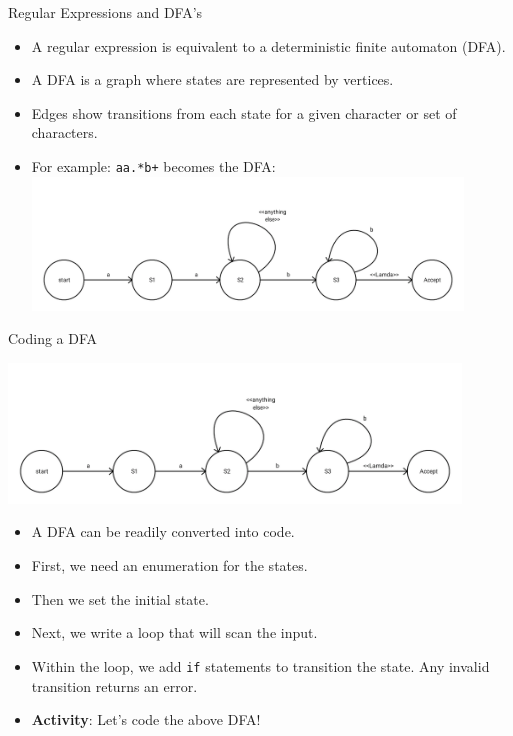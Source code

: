 \documentclass[]{beamer}
\begin{document}
\begin{frame}{Regular Expressions and DFA's}
    \begin{itemize}[<+->]
        \item A regular expression is equivalent to a deterministic
            finite automaton (DFA).
        \item A DFA is a graph where states are represented by vertices.
        \item Edges show transitions from each state for a given
            character or set of characters.
        \item For example: \texttt{aa.*b+} becomes the DFA:
            \newline\includegraphics[width=0.9\textwidth]{images/aabdfa} 
    \end{itemize}
\end{frame}

\begin{frame}{Coding a DFA}
    \begin{center}
        \includegraphics[width=0.9\textwidth]{images/aabdfa} 
    \end{center}
    \begin{itemize}[<+->]
        \item A DFA can be readily converted into code.
        \item First, we need an enumeration for the states.
        \item Then we set the initial state.
        \item Next, we write a loop that will scan the input.
        \item Within the loop, we add \texttt{if} statements to transition the
            state.  Any invalid transition returns an error.
        \item \textbf{Activity}: Let's code the above DFA!
    \end{itemize}
\end{frame}
\end{document}
